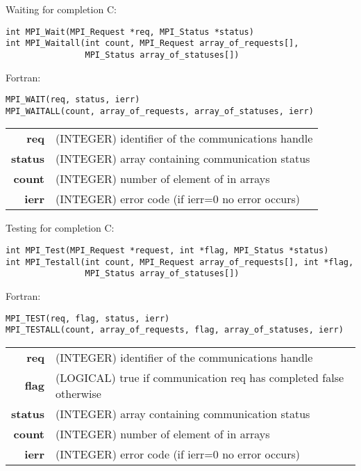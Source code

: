 \documentclass[aspectratio=43]{beamer}
\begin{document}
\begin{frame}[fragile]{Waiting for completion}
\footnotesize
C:
\vspace{-0.2cm}
\begin{verbatim}
int MPI_Wait(MPI_Request *req, MPI_Status *status)
int MPI_Waitall(int count, MPI_Request array_of_requests[],
                MPI_Status array_of_statuses[])
\end{verbatim}
\vspace{-0.2cm}
Fortran:
\vspace{-0.2cm}
\begin{verbatim}
MPI_WAIT(req, status, ierr)
MPI_WAITALL(count, array_of_requests, array_of_statuses, ierr)
\end{verbatim}
\begin{black1block}{}
\begin{tabular}{rl}
    \textbf{req} & (INTEGER) identifier of the communications handle\\
    \textbf{status} & (INTEGER) array containing communication status\\
    \textbf{count} & (INTEGER) number of element of in arrays\\
    \textbf{ierr} & (INTEGER) error code (if ierr=0 no error occurs)\\
\end{tabular}
\end{black1block}
\end{frame}

\begin{frame}[fragile]{Testing for completion}
\footnotesize
C:
\vspace{-0.2cm}
\begin{verbatim}
int MPI_Test(MPI_Request *request, int *flag, MPI_Status *status)
int MPI_Testall(int count, MPI_Request array_of_requests[], int *flag,
                MPI_Status array_of_statuses[])
\end{verbatim}
\vspace{-0.2cm}
Fortran:
\vspace{-0.2cm}
\begin{verbatim}
MPI_TEST(req, flag, status, ierr)
MPI_TESTALL(count, array_of_requests, flag, array_of_statuses, ierr)
\end{verbatim}
\begin{black1block}{}
\begin{tabular}{rl}
    \textbf{req} & (INTEGER) identifier of the communications handle\\
    \textbf{flag} & (LOGICAL) true if communication req has completed false otherwise\\
    \textbf{status} & (INTEGER) array containing communication status\\
    \textbf{count} & (INTEGER) number of element of in arrays\\
    \textbf{ierr} & (INTEGER) error code (if ierr=0 no error occurs)\\
\end{tabular}
\end{black1block}
\end{frame}
\end{document}
